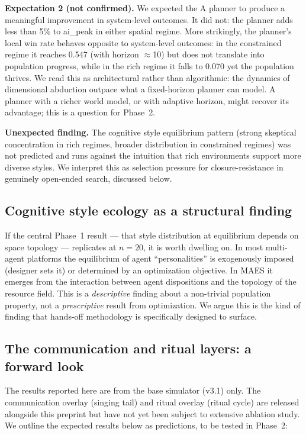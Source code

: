 \documentclass[11pt,a4paper]{article}
\begin{document}
\textbf{Expectation 2 (not confirmed).} We expected the A\* planner to
produce a meaningful improvement in system-level outcomes. It did not:
the planner adds less than 5\% to ai\_peak in either spatial regime. More
strikingly, the planner's local win rate behaves opposite to system-level
outcomes: in the constrained regime it reaches 0.547 (with horizon
$\approx$10) but does not translate into population progress, while in
the rich regime it falls to 0.070 yet the population thrives. We read
this as architectural rather than algorithmic: the dynamics of
dimensional abduction outpace what a fixed-horizon planner can model.
A planner with a richer world model, or with adaptive horizon, might
recover its advantage; this is a question for Phase~2.

\textbf{Unexpected finding.} The cognitive style equilibrium pattern
(strong skeptical concentration in rich regimes, broader distribution in
constrained regimes) was not predicted and runs against the intuition
that rich environments support more diverse styles. We interpret this as
selection pressure for closure-resistance in genuinely open-ended search,
discussed below.

\subsection{Cognitive style ecology as a structural finding}

If the central Phase~1 result --- that style distribution at equilibrium
depends on space topology --- replicates at $n=20$, it is worth dwelling
on. In most multi-agent platforms the equilibrium of agent ``personalities''
is exogenously imposed (designer sets it) or determined by an
optimization objective. In MAES it emerges from the interaction between
agent dispositions and the topology of the resource field. This is a
\emph{descriptive} finding about a non-trivial population property, not a
\emph{prescriptive} result from optimization. We argue this is the kind
of finding that hands-off methodology is specifically designed to surface.

\subsection{The communication and ritual layers: a forward look}

The results reported here are from the base simulator (v3.1) only. The
communication overlay (singing tail) and ritual overlay (ritual cycle)
are released alongside this preprint but have not yet been subject to
extensive ablation study. We outline the expected results below as
predictions, to be tested in Phase~2:
\end{document}
